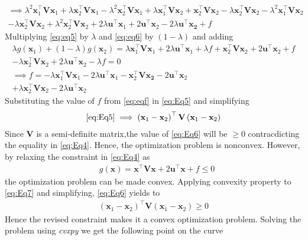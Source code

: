 \documentclass[12pt]{article}
\providecommand{\brak}[1]{\ensuremath{\left(#1\right)}}
\let\vec\mathbf
\begin{document}
\begin{multline}
	\label{eq:eq7}
	\implies 
	\lambda^2\vec{x}_1^\top\vec{V}\vec{x}_1+\lambda\vec{x}_2^\top\vec{V}\vec{x}_1-\lambda^2\vec{x}_2^\top\vec{V}\vec{x}_1+ \lambda\vec{x}_1^\top\vec{V}\vec{x}_2+\vec{x}_2^\top\vec{V}\vec{x}_2 -\lambda\vec{x}_2^\top\vec{V}\vec{x}_2-\lambda^2\vec{x}_1^\top\vec{V}\vec{x}_2\\
	-\lambda\vec{x}_2^\top\vec{V}\vec{x}_2+\lambda^2\vec{x}_2^\top\vec{V}\vec{x}_2+ 2\lambda\vec{u}^\top\vec{x}_1+2\vec{u}^\top\vec{x}_2-2\lambda\vec{u}^\top\vec{x_2} +f
\end{multline}
Multiplying \eqref{eq:eq5} by $\lambda$ and \eqref{eq:eq6} by $\brak{1-\lambda}$ and adding
\begin{multline}
	\label{eq:eqf}
	\lambda g\brak{\vec{x}_1}+ \brak{1-\lambda}g\brak{\vec{x}_2} = \lambda\vec{x}_1^\top\vec{V}\vec{x}_1 + 2\lambda\vec{u}^\top\vec{x}_1 + \lambda f + \vec{x}_2^\top\vec{V}\vec{x}_2+2\vec{u}^\top\vec{x}_2+f\\ 
	-\lambda\vec{x}_2^\top\vec{V}\vec{x}_2+2\lambda\vec{u}^\top\vec{x}_2-\lambda f = 0 \\
	\implies f = 
	-\lambda\vec{x}_1^\top\vec{V}\vec{x}_1 - 2\lambda\vec{u}^\top\vec{x}_1 -\vec{x}_2^\top\vec{V}\vec{x_2}-2\vec{u}^\top\vec{x}_2\\ 
	+\lambda\vec{x}_2^\top\vec{V}\vec{x}_2-2\lambda\vec{u}^\top\vec{x}_2
\end{multline}
Substituting the value of $f$ from \eqref{eq:eqf} in \eqref{eq:Eq5} and simplifying
\begin{align}
	\label{eq:Eq6}
	\eqref{eq:Eq5} \implies \brak{\vec{x}_1-\vec{x}_2}^\top\vec{V}\brak{\vec{x}_1-\vec{x}_2} 
\end{align}
Since $\vec{V}$ is a semi-definite matrix,the value of \eqref{eq:Eq6} will be $\ge 0$ contracdicting the equality in \eqref{eq:Eq4}. 
Hence, the optimization problem is nonconvex. However, by relaxing the constraint in \eqref{eq:Eq4} as
\begin{align}
	\label{eq:Eq7}
	& g\brak{\vec{x}} = \vec{x}^\top\vec{V}\vec{x} + 2\vec{u}^\top\vec{x} + f \le 0  
\end{align}
the optimization problem can be made convex. Applying convexity property to \eqref{eq:Eq7} and simplifying, \eqref{eq:Eq6} yields to
\begin{align}
	\label{eq:Eq8}
	\brak{\vec{x}_1-\vec{x}_2}^\top\vec{V}\brak{\vec{x}_1-\vec{x}_2} \ge 0 
\end{align}
Hence the revised constraint makes it a convex optimization problem. Solving the problem using \textit{cvxpy} we get the following point on the curve
\end{document}
